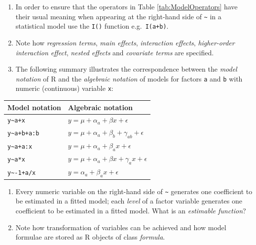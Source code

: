 \documentclass[
]{book}
\begin{document}
\begin{enumerate}
\def\labelenumi{(\alph{enumi})}
\setcounter{enumi}{2}
\item
  In order to ensure that the operators in Table \ref{tab:ModelOperators} have their usual meaning when appearing at the right-hand side of \texttt{\textasciitilde{}} in a statistical model use the \texttt{I()} function e.g.~\texttt{I(a+b)}.
\item
  Note how \emph{{regression terms}}, \emph{{main effects}}, \emph{{interaction effects}}, \emph{{higher-order interaction effect}}, \emph{{nested effects}} and \emph{{covariate terms}} are specified.
\item
  The following summary illustrates the correspondence between the \emph{{model notation}} of R and the \emph{{algebraic notation}} of models for factors \texttt{a} and \texttt{b} with numeric (continuous) variable \texttt{x}:
\end{enumerate}

\begin{longtable}[]{@{}
  >{\raggedright\arraybackslash}p{}
  >{\raggedright\arraybackslash}p{}@{}}
\toprule\noalign{}
\begin{minipage}[b]{\linewidth}\raggedright
Model notation
\end{minipage} & \begin{minipage}[b]{\linewidth}\raggedright
Algebraic notation
\end{minipage} \\
\midrule\noalign{}
\endhead
\bottomrule\noalign{}
\endlastfoot
\texttt{y\textasciitilde{}a+x} & \(y = \mu + \alpha_a + \beta x + \epsilon\) \\
\texttt{y\textasciitilde{}a+b+a:b} & \(y = \mu + \alpha_a + \beta_b + \gamma_{ab} + \epsilon\) \\
\texttt{y\textasciitilde{}a+a:x} & \(y = \mu + \alpha_a + \beta_a x + \epsilon\) \\
\texttt{y\textasciitilde{}a*x} & \(y = \mu + \alpha_a + \beta x + \gamma_a x + \epsilon\) \\
\texttt{y\textasciitilde{}-1+a/x} & \(y = \alpha_a + \beta_a x + \epsilon\) \\
\end{longtable}

\begin{enumerate}
\def\labelenumi{(\alph{enumi})}
\setcounter{enumi}{5}
\item
  Every numeric variable on the right-hand side of \texttt{\textasciitilde{}} generates one coefficient to be estimated in a fitted model; each \emph{{level}} of a factor variable generates one coefficient to be estimated in a fitted model. What is an \emph{{estimable function}}?
\item
  Note how transformation of variables can be achieved and how model formulae are stored as R objects of class \emph{{formula}}.
\end{enumerate}
\end{document}
